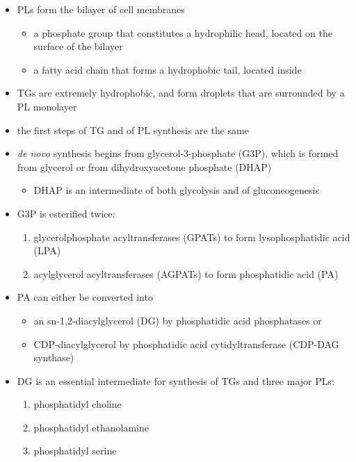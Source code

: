 \documentclass{scrartcl}
\begin{document}
\begin{itemize}
\item PLs form the bilayer of cell membranes
\begin{itemize}
\item a phosphate group that constitutes a hydrophilic head, located on the surface of the bilayer
\item a fatty acid chain that forms a hydrophobic tail, located inside
\end{itemize}
\item TGs are extremely hydrophobic, and form droplets
that are surrounded by a PL monolayer
\item the first steps of TG and of PL synthesis are the same
\item \emph{de novo} synthesis begins from glycerol-3-phosphate (G3P), which is
formed from glycerol or from dihydroxyacetone phosphate (DHAP)
\begin{itemize}
\item DHAP is an intermediate of both glycolysis and of gluconeogenesis
\end{itemize}
\item G3P is esterified twice:
\begin{enumerate}
\item glycerolphosphate acyltransferases (GPATs) to form lysophosphatidic acid (LPA)
\item acylglycerol acyltransferases (AGPATs) to form phosphatidic acid (PA)
\end{enumerate}
\item PA can either be converted into
\begin{itemize}
\item an sn-1,2-diacylglycerol (DG) by phosphatidic acid phosphatases or
\item CDP-diacylglycerol by phosphatidic acid cytidyltransferase (CDP-DAG synthase)
\end{itemize}
\item DG is an essential intermediate for synthesis of TGs and three major PLs:
\begin{enumerate}
\item phosphatidyl choline
\item phosphatidyl ethanolamine
\item phosphatidyl serine
\end{enumerate}
\end{itemize}
\end{document}
